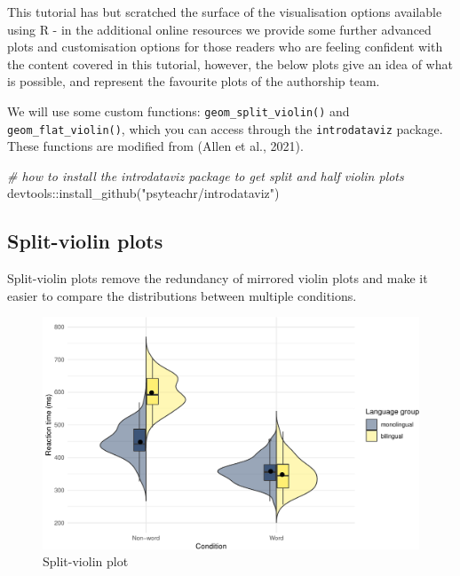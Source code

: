 \documentclass[
  english,
  doc,floatsintext]{apa6}
\newenvironment{Shaded}{\begin{snugshade}}{\end{snugshade}}
\newcommand{\CommentTok}[1]{\textcolor[rgb]{0.56,0.35,0.01}{\textit{#1}}}
\newcommand{\FunctionTok}[1]{\textcolor[rgb]{0.00,0.00,0.00}{#1}}
\newcommand{\NormalTok}[1]{#1}
\newcommand{\SpecialCharTok}[1]{\textcolor[rgb]{0.00,0.00,0.00}{#1}}
\newcommand{\StringTok}[1]{\textcolor[rgb]{0.31,0.60,0.02}{#1}}
\begin{document}
This tutorial has but scratched the surface of the visualisation options available using R - in the additional online resources we provide some further advanced plots and customisation options for those readers who are feeling confident with the content covered in this tutorial, however, the below plots give an idea of what is possible, and represent the favourite plots of the authorship team.

We will use some custom functions: \texttt{geom\_split\_violin()} and \texttt{geom\_flat\_violin()}, which you can access through the \texttt{introdataviz} package. These functions are modified from (Allen et al., 2021).

\begin{Shaded}
\begin{Highlighting}[]
\CommentTok{\# how to install the introdataviz package to get split and half violin plots}
\NormalTok{devtools}\SpecialCharTok{::}\FunctionTok{install\_github}\NormalTok{(}\StringTok{"psyteachr/introdataviz"}\NormalTok{)}
\end{Highlighting}
\end{Shaded}

\hypertarget{split-violin-plots}{%
\subsection{Split-violin plots}\label{split-violin-plots}}

Split-violin plots remove the redundancy of mirrored violin plots and make it easier to compare the distributions between multiple conditions.

\begin{figure}

{\centering \includegraphics[width=1\linewidth]{images/splitviolin-1} 

}

\caption{Split-violin plot}\label{fig:splitviolin}
\end{figure}
\end{document}
